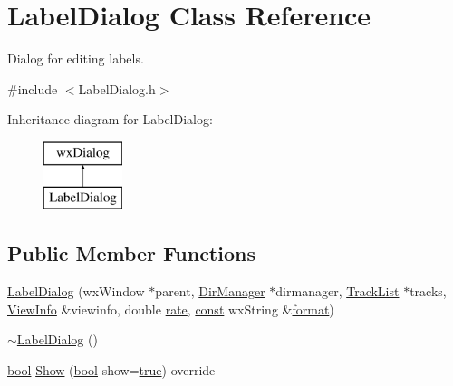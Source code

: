 \hypertarget{class_label_dialog}{}\section{Label\+Dialog Class Reference}
\label{class_label_dialog}


Dialog for editing labels.  




{\ttfamily \#include $<$Label\+Dialog.\+h$>$}

Inheritance diagram for Label\+Dialog\+:\begin{figure}[H]
\begin{center}
\leavevmode
\includegraphics[height=2.000000cm]{class_label_dialog}
\end{center}
\end{figure}
\subsection*{Public Member Functions}
\begin{DoxyCompactItemize}
\item 
\hyperlink{class_label_dialog_a6f3bea258bd63ca530cc64a30210df90}{Label\+Dialog} (wx\+Window $\ast$parent, \hyperlink{class_dir_manager}{Dir\+Manager} $\ast$dirmanager, \hyperlink{class_track_list}{Track\+List} $\ast$tracks, \hyperlink{class_view_info}{View\+Info} \&viewinfo, double \hyperlink{seqread_8c_ad89d3fac2deab7a9cf6cfc8d15341b85}{rate}, \hyperlink{getopt1_8c_a2c212835823e3c54a8ab6d95c652660e}{const} wx\+String \&\hyperlink{_export_p_c_m_8cpp_a317afff57d87a89158c2b038d37b2b08}{format})
\item 
\hyperlink{class_label_dialog_a3b7f9c87d666058cae324ce646fda011}{$\sim$\+Label\+Dialog} ()
\item 
\hyperlink{mac_2config_2i386_2lib-src_2libsoxr_2soxr-config_8h_abb452686968e48b67397da5f97445f5b}{bool} \hyperlink{class_label_dialog_af295bb85143b54c46065225422f841f1}{Show} (\hyperlink{mac_2config_2i386_2lib-src_2libsoxr_2soxr-config_8h_abb452686968e48b67397da5f97445f5b}{bool} show=\hyperlink{mac_2config_2i386_2lib-src_2libsoxr_2soxr-config_8h_a41f9c5fb8b08eb5dc3edce4dcb37fee7}{true}) override
\end{DoxyCompactItemize}


